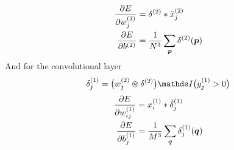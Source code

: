 \begin{itemize}
\begin{align}
\end{align}
\begin{align}
\frac{\partial E}{\partial w^{(2)}_j} &= \delta^{(2)} * \tilde{x}^{(2)}_j \\
\frac{\partial E}{\partial b^{(2)}} &= \frac{1}{N^3}\sum_{\vect{p}}
\delta^{(2)}(\vect{p})
\end{align}
And for the convolutional layer
\begin{equation}
\delta^{(1)}_j = \big(w^{(2)}_{j}\circledast\delta^{(2)}\big)\I\big(y^{(1)}_j >
0\big)
\end{equation}
\begin{align}
\frac{\partial E}{\partial w^{(1)}_{ij}} &= x^{(1)}_i * \tilde{\delta}^{(1)}_j\\
\frac{\partial E}{\partial b^{(1)}_j} &= \frac{1}{M^3}\sum_{\vect{q}}
\delta^{(1)}_j(\vect{q})
\end{align}
\end{itemize}

